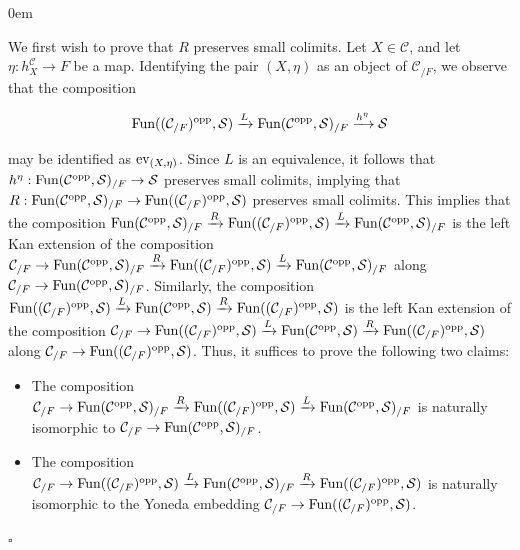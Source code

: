 \documentclass[10pt]{article}
\newcommand{\mS}{\mathcal S}
\newcommand{\C}{\mathcal C}
\renewcommand{\qed}{\hfill$\square$}
\renewenvironment{proof}{\begin{addmargin}[1em]{0em}\begin{newproof}}{\end{newproof}\end{addmargin}\qed}
\theoremstyle{witharg}
\theoremstyle{witharg}
\theoremstyle{witharg2}
\begin{document}
\begin{proof}

    We first wish to prove that $R$ preserves small colimits. Let $X\in \C$, and let $\eta:h^\C_X\rightarrow F$ be a map. Identifying the pair $(X,\eta)$ as an object of $\C_{/F}$, we observe that the composition 

    $$\textnormal{Fun}((\C_{/F})^{\textnormal{opp}},\mS)\xrightarrow{L}\textnormal{Fun}(\C^{\textnormal{opp}},\mS)_{/F}\xrightarrow{h^\eta}\mS$$

    \noindent may be identified as $\textnormal{ev}_{(X,\eta)}$. Since $L$ is an equivalence, it follows that $h^\eta:\textnormal{Fun}(\C^{\textnormal{opp}},\mS)_{/F}\rightarrow \mS$ preserves small colimits, implying that $R:\textnormal{Fun}(\C^{\textnormal{opp}},\mS)_{/F}\rightarrow \textnormal{Fun}((\C_{/F})^{\textnormal{opp}},\mS)$ preserves small colimits. This implies that the composition $\textnormal{Fun}(\C^{\textnormal{opp}},\mS)_{/F}\xrightarrow{R}\textnormal{Fun}((\C_{/F})^{\textnormal{opp}},\mS)\xrightarrow{L}\textnormal{Fun}(\C^{\textnormal{opp}},\mS)_{/F}$ is the left Kan extension of the composition $\C_{/F}\rightarrow \textnormal{Fun}(\C^{\textnormal{opp}},\mS)_{/F}\xrightarrow{R}\textnormal{Fun}((\C_{/F})^{\textnormal{opp}},\mS)\xrightarrow{L}\textnormal{Fun}(\C^{\textnormal{opp}},\mS)_{/F}$ along $\C_{/F}\rightarrow \textnormal{Fun}(\C^{\textnormal{opp}},\mS)_{/F}$. Similarly, the composition $\textnormal{Fun}((\C_{/F})^{\textnormal{opp}},\mS)\xrightarrow{L}\textnormal{Fun}(\C^{\textnormal{opp}},\mS)\xrightarrow{R}\textnormal{Fun}((\C_{/F})^{\textnormal{opp}},\mS)$ is the left Kan extension of the composition $\C_{/F}\rightarrow \textnormal{Fun}((\C_{/F})^{\textnormal{opp}},\mS)\xrightarrow{L}\textnormal{Fun}(\C^{\textnormal{opp}},\mS)\xrightarrow{R}\textnormal{Fun}((\C_{/F})^{\textnormal{opp}},\mS)$ along $\C_{/F}\rightarrow \textnormal{Fun}((\C_{/F})^{\textnormal{opp}},\mS)$. Thus, it suffices to prove the following two claims:

    \begin{itemize}
    
        \item [$(1)$] The composition $\C_{/F}\rightarrow \textnormal{Fun}(\C^{\textnormal{opp}},\mS)_{/F}\xrightarrow{R}\textnormal{Fun}((\C_{/F})^{\textnormal{opp}},\mS)\xrightarrow{L}\textnormal{Fun}(\C^{\textnormal{opp}},\mS)_{/F}$ is naturally isomorphic to $\C_{/F}\rightarrow \textnormal{Fun}(\C^{\textnormal{opp}},\mS)_{/F}$.

        \item [$(2)$] The composition $\C_{/F}\rightarrow \textnormal{Fun}((\C_{/F})^{\textnormal{opp}},\mS)\xrightarrow{L}\textnormal{Fun}(\C^{\textnormal{opp}},\mS)_{/F}\xrightarrow{R}\textnormal{Fun}((\C_{/F})^{\textnormal{opp}},\mS)$ is naturally isomorphic to the Yoneda embedding $\C_{/F}\rightarrow \textnormal{Fun}((\C_{/F})^{\textnormal{opp}},\mS)$. 


\end{itemize}
\end{proof}
\end{document}
